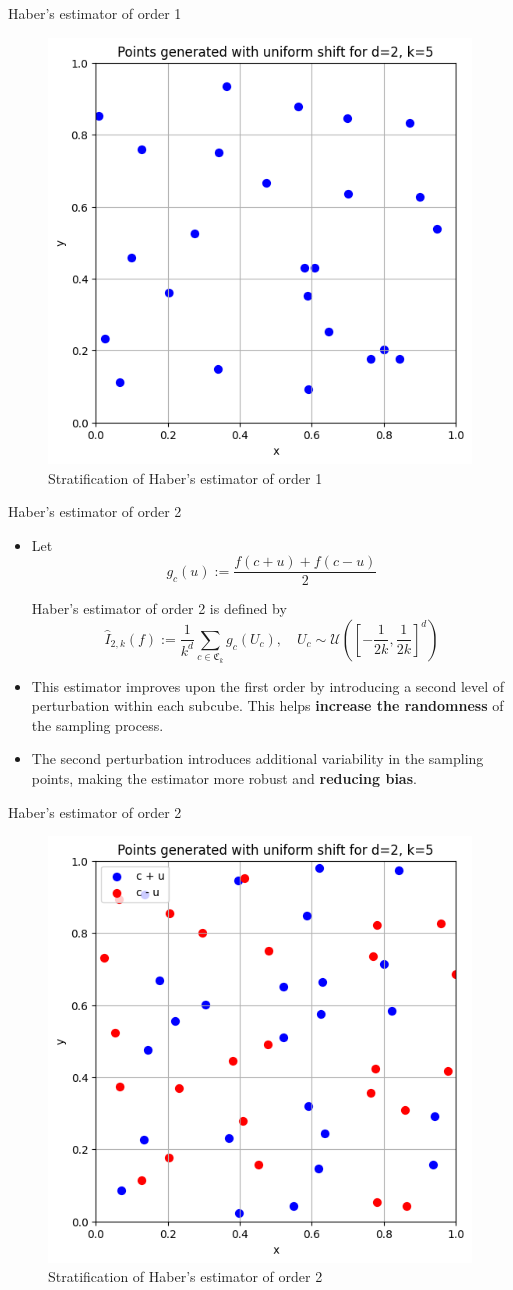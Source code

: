 \documentclass[aspectratio=169,xcolor=dvipsnames]{beamer}
\begin{document}
    \begin{frame}{Haber's estimator of order 1}
        \begin{figure}
            \centering
            \includegraphics[width=0.4\linewidth]{points4.png}
            \caption{Stratification of Haber's estimator of order 1}
            \label{fig:4}
        \end{figure}
    \end{frame}

    \begin{frame}{Haber's estimator of order 2}
        \begin{itemize}
            \item<1-> Let
            $$g_c(u) := \frac{f(c + u) + f(c - u)}{2}$$
    
            Haber's estimator of order 2 is defined by 
            $$\hat{I}_{2,k}(f) := \frac{1}{k^d} \sum_{c \in \mathfrak{C}_k} g_c(U_c), \quad U_c \sim \mathcal{U}\left(\left[-\frac{1}{2k}, \frac{1}{2k}\right]^d\right)$$
    
            \item<2-> This estimator improves upon the first order by introducing a second level of perturbation within each subcube. This helps \textbf{increase the randomness} of the sampling process.
    
            \item<3-> The second perturbation introduces additional variability in the sampling points, making the estimator more robust and \textbf{reducing bias}.
    
        \end{itemize}
    \end{frame}

    \begin{frame}{Haber's estimator of order 2}
        \begin{figure}
            \centering
            \includegraphics[width=0.4\linewidth]{points5.png}
            \caption{Stratification of Haber's estimator of order 2}
            \label{fig:5}
        \end{figure}
    \end{frame}
\end{document}

